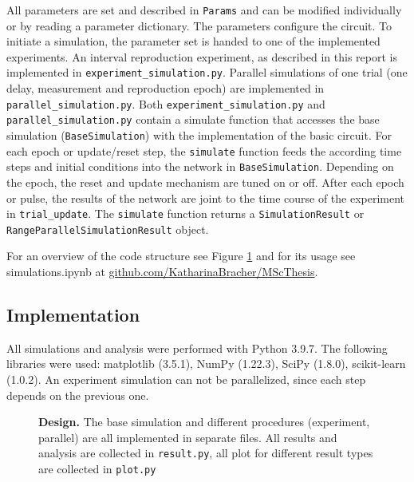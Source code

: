 \documentclass[10pt]{article}
\begin{document}
All parameters are set and described in \texttt{Params} and can be modified individually or by reading a parameter dictionary. The parameters configure the circuit. 
To initiate a simulation, the parameter set is handed to one of the implemented experiments. 
An interval reproduction experiment, as described in this report is implemented in \texttt{experiment\_simulation.py}. 
Parallel simulations of one trial (one delay, measurement and reproduction epoch) are implemented in \texttt{parallel\_simulation.py}.
Both \texttt{experiment\_simulation.py} and \texttt{parallel\_simulation.py} contain a simulate function that accesses the base simulation (\texttt{BaseSimulation}) with the implementation of the basic circuit.
For each epoch or update/reset step, the \texttt{simulate} function feeds the according time steps and initial conditions into the network in \texttt{BaseSimulation}. Depending on the epoch, the reset and update mechanism are tuned on or off. 
After each epoch or pulse, the results of the network are joint to the time course of the experiment in \texttt{trial\_update}. The \texttt{simulate} function returns a \texttt{SimulationResult} or \texttt{RangeParallelSimulationResult} object.

For an overview of the code structure see Figure \ref{fig:code} and for its usage see simulations.ipynb at \href{https://github.com/KatharinaBracher/MScThesis}{github.com/KatharinaBracher/MScThesis}. 

\subsection*{Implementation}
All simulations and analysis were performed with Python 3.9.7. 
The following libraries were used: matplotlib (3.5.1), NumPy (1.22.3), SciPy (1.8.0), scikit-learn (1.0.2). 
An experiment simulation can not be parallelized, since each step depends on the previous one.


\begin{figure}[ht]
	\vspace*{-2cm}
	\caption{\textbf{Design.} The base simulation and different procedures (experiment, parallel) are all implemented in separate files. All results and analysis are collected in \texttt{result.py}, all plot for different result types are collected in \texttt{plot.py}}
\label{fig:code}
\end{figure}


\clearpage
{}
\printbibliography
\end{document}
